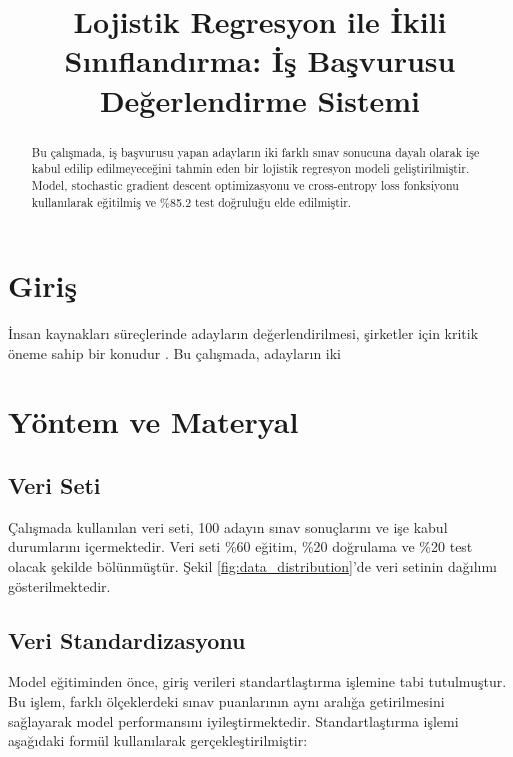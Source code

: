 \documentclass[conference]{IEEEtran}
\begin{document}
\title{Lojistik Regresyon ile İkili Sınıflandırma: İş Başvurusu Değerlendirme Sistemi}

\author{
}

\maketitle

\begin{abstract}
Bu çalışmada, iş başvurusu yapan adayların iki farklı sınav sonucuna dayalı
olarak işe kabul edilip edilmeyeceğini tahmin eden bir lojistik regresyon
modeli geliştirilmiştir. Model, stochastic gradient descent optimizasyonu ve
cross-entropy loss fonksiyonu kullanılarak eğitilmiş ve \%85.2 test doğruluğu
elde edilmiştir.
\end{abstract}

\section{Giriş}
İnsan kaynakları süreçlerinde adayların değerlendirilmesi, şirketler için
kritik öneme sahip bir konudur \cite{smith2023}. Bu çalışmada, adayların iki

\section{Yöntem ve Materyal}

\subsection{Veri Seti}
Çalışmada kullanılan veri seti, 100 adayın sınav sonuçlarını ve işe kabul
durumlarını içermektedir. Veri seti \%60 eğitim, \%20 doğrulama ve \%20 test
olacak şekilde bölünmüştür. Şekil \ref{fig:data_distribution}'de veri setinin
dağılımı gösterilmektedir.

\subsection{Veri Standardizasyonu}
Model eğitiminden önce, giriş verileri standartlaştırma işlemine tabi
tutulmuştur. Bu işlem, farklı ölçeklerdeki sınav puanlarının aynı aralığa
getirilmesini sağlayarak model performansını iyileştirmektedir.
Standartlaştırma işlemi aşağıdaki formül kullanılarak gerçekleştirilmiştir:
\end{document}
